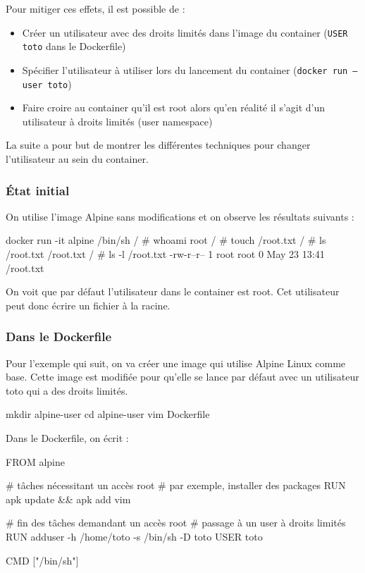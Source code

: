 \documentclass[11pt,a4paper,oneside]{report}
\newcommand{\code}[1]{\texttt{#1}}
\begin{document}
Pour mitiger ces effets, il est possible de :
\begin{itemize}
\item Créer un utilisateur avec des droits limités dans l'image du container (\code{USER toto} dans le Dockerfile)
\item Spécifier l'utilisateur à utiliser lors du lancement du container (\code{docker run --user toto})
\item Faire croire au container qu'il est root alors qu'en réalité il s'agit d'un utilisateur à droits limités (user namespace)
\end{itemize}

La suite a pour but de montrer les différentes techniques pour changer l'utilisateur au sein du container.

\subsubsection{État initial}
On utilise l'image Alpine sans modifications et on observe les résultats suivants :

\begin{textcode}
docker run -it alpine /bin/sh
/ # whoami
root
/ # touch /root.txt
/ # ls /root.txt
/root.txt
/ # ls -l /root.txt
-rw-r--r--    1 root     root             0 May 23 13:41 /root.txt
\end{textcode}

On voit que par défaut l'utilisateur dans le container est root. Cet utilisateur peut donc écrire un fichier à la racine.

\subsubsection{Dans le Dockerfile}
Pour l'exemple qui suit, on va créer une image qui utilise Alpine Linux comme base. Cette image est modifiée pour qu'elle se lance par défaut avec un utilisateur toto qui a des droits limités.

\begin{bashcode}
mkdir alpine-user
cd alpine-user
vim Dockerfile
\end{bashcode}

Dans le Dockerfile, on écrit :
\begin{bashcode}
FROM alpine

# tâches nécessitant un accès root
# par exemple, installer des packages
RUN apk update && apk add vim

# fin des tâches demandant un accès root
# passage à un user à droits limités
RUN adduser -h /home/toto -s /bin/sh -D toto
USER toto

CMD ["/bin/sh"]
\end{bashcode}
\end{document}

